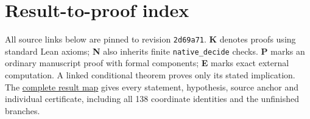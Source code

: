 \section*{Result-to-proof index}\label{j:proof-index}

All source links below are pinned to revision \texttt{2d69a71}. \textbf{K} denotes proofs using standard Lean axioms; \textbf{N} also inherits finite \texttt{native\_decide} checks. \textbf{P} marks an ordinary manuscript proof with formal components; \textbf{E} marks exact external computation. A linked conditional theorem proves only its stated implication. The \href{https://github.com/alejandrozu/kobon-proof/blob/main/manuscripts/2026-10-03/shared/proof_map.md}{complete result map} gives every statement, hypothesis, source anchor and individual certificate, including all 138 coordinate identities and the unfinished branches.


